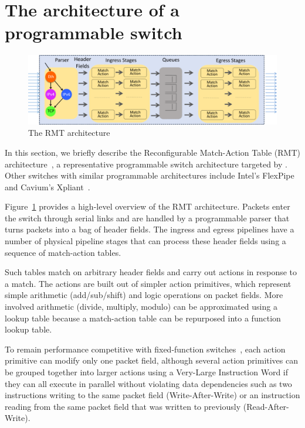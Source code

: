 \section{The architecture of a programmable switch}
\label{s:context}

\begin{figure}
\includegraphics[width=\textwidth]{p4_switch_model.png}
\caption{The RMT architecture}
\label{fig:architecture}
\end{figure}

\label{s:architecture}
In this section, we briefly describe the Reconfigurable Match-Action Table
(RMT) architecture~\cite{rmt}, a representative programmable switch
architecture targeted by \pktlanguage{}. Other switches with similar
programmable architectures include Intel's FlexPipe~\cite{flexpipe} and
Cavium's Xpliant~\cite{xpliant}.

Figure~\ref{fig:architecture} provides a high-level overview of the RMT
architecture. Packets enter the switch through serial links and are handled by
a programmable parser that turns packets into a bag of header fields. The
ingress and egress pipelines have a number of physical pipeline stages that can
process these header fields using a sequence of match-action tables.

Such tables match on arbitrary header fields and carry out actions in response
to a match.  The actions are built out of simpler action primitives, which
represent simple arithmetic (add/sub/shift) and logic operations on packet
fields.  More involved arithmetic (divide, multiply, modulo) can be
approximated using a lookup table because a match-action table can be
repurposed into a function lookup table.

To remain performance competitive with fixed-function switches~\cite{mellanox,
trident, tomahawk}, each action primitive can modify only one packet field,
although several action primitives can be grouped together into larger actions
using a Very-Large Instruction Word if they can all execute in parallel without
violating data dependencies such as two instructions writing to the same packet
field (Write-After-Write) or an instruction reading from the same packet field
that was written to previously (Read-After-Write).

